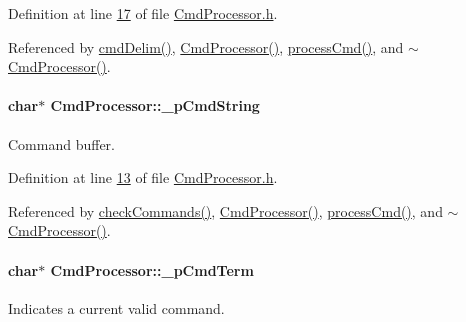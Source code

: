 Definition at line \hyperlink{_cmd_processor_8h_source_l00017}{17} of file \hyperlink{_cmd_processor_8h_source}{CmdProcessor.h}.



Referenced by \hyperlink{_cmd_processor_8cpp_source_l00048}{cmdDelim()}, \hyperlink{_cmd_processor_8cpp_source_l00011}{CmdProcessor()}, \hyperlink{_cmd_processor_8cpp_source_l00092}{processCmd()}, and \hyperlink{_cmd_processor_8cpp_source_l00025}{$\sim$CmdProcessor()}.

\hypertarget{class_cmd_processor_acc77d1f9a20e535e1073950001c0cc36}{
\paragraph[{\_\-pCmdString}]{\setlength{\rightskip}{0pt plus 5cm}char$\ast$ {\bf CmdProcessor::\_\-pCmdString}}\hfill}
\label{class_cmd_processor_acc77d1f9a20e535e1073950001c0cc36}


Command buffer. 



Definition at line \hyperlink{_cmd_processor_8h_source_l00013}{13} of file \hyperlink{_cmd_processor_8h_source}{CmdProcessor.h}.



Referenced by \hyperlink{_cmd_processor_8cpp_source_l00068}{checkCommands()}, \hyperlink{_cmd_processor_8cpp_source_l00011}{CmdProcessor()}, \hyperlink{_cmd_processor_8cpp_source_l00092}{processCmd()}, and \hyperlink{_cmd_processor_8cpp_source_l00025}{$\sim$CmdProcessor()}.

\hypertarget{class_cmd_processor_ac3499e23267a4f54dc409e51555d4b26}{
\paragraph[{\_\-pCmdTerm}]{\setlength{\rightskip}{0pt plus 5cm}char$\ast$ {\bf CmdProcessor::\_\-pCmdTerm}}\hfill}
\label{class_cmd_processor_ac3499e23267a4f54dc409e51555d4b26}


Indicates a current valid command. 




